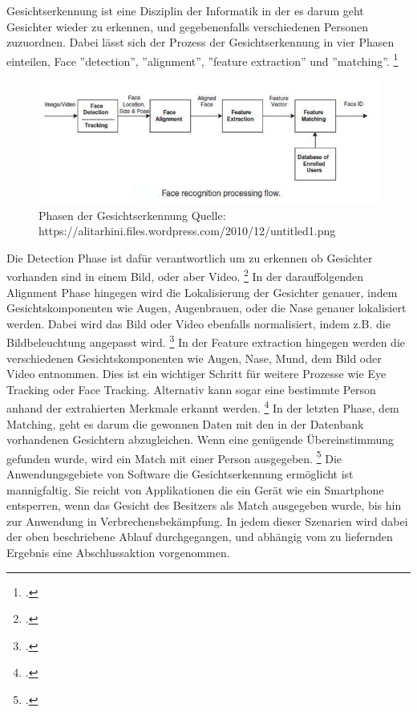 \documentclass[12pt, a4paper]{scrbook}
\begin{document}
Gesichtserkennung ist eine Disziplin der Informatik in der es darum geht Gesichter wieder zu erkennen, und gegebenenfalls verschiedenen Personen zuzuordnen. Dabei lässt sich der Prozess der
Gesichtserkennung in vier Phasen einteilen, Face ''detection'', ''alignment'', ''feature extraction'' und ''matching''.
\footcite[Vgl. ][2]{HandbookFaceRec}
\begin{figure}
\includegraphics[width=\linewidth]{Bilder/FaceRecognition.png}
\caption{ Phasen der Gesichtserkennung \newline Quelle: https://alitarhini.files.wordpress.com/2010/12/untitled1.png }
\label{fig:Face Recognition}
\end{figure}
Die Detection Phase ist dafür verantwortlich um zu erkennen ob Gesichter vorhanden sind in einem Bild, oder aber Video.
\footcite[Vgl. ][2]{HandbookFaceRec}
In der darauffolgenden Alignment Phase hingegen wird die Lokalisierung der Gesichter genauer, indem Gesichtskomponenten wie Augen, Augenbrauen, oder die Nase genauer lokalisiert werden. Dabei
wird das Bild oder Video ebenfalls normalisiert, indem z.B. die Bildbeleuchtung angepasst wird.
 \footcite[Vgl. ][2]{HandbookFaceRec}
In der Feature extraction hingegen werden die verschiedenen Gesichtskomponenten wie Augen, Nase, Mund, dem Bild oder Video entnommen. Dies ist ein wichtiger Schritt für weitere Prozesse wie
Eye Tracking oder Face Tracking. Alternativ kann sogar eine bestimmte Person anhand der extrahierten Merkmale erkannt werden.
\footcite[Vgl. ][Abstract]{IEEE}
In der letzten Phase, dem Matching, geht es darum die gewonnen Daten mit den in der Datenbank vorhandenen Gesichtern abzugleichen. Wenn eine genügende Übereinstimmung gefunden wurde, wird ein
Match mit einer Person ausgegeben.
  \footcite[Vgl. ][3]{HandbookFaceRec}
Die Anwendungsgebiete von Software die Gesichtserkennung ermöglicht ist mannigfaltig. Sie reicht von Applikationen die ein Gerät wie ein Smartphone entsperren, wenn das Gesicht des Besitzers als
Match ausgegeben wurde, bis hin zur Anwendung in Verbrechensbekämpfung. In jedem dieser Szenarien wird dabei der oben beschriebene Ablauf durchgegangen, und abhängig vom zu liefernden Ergebnis
eine Abschlussaktion vorgenommen.
\end{document}
